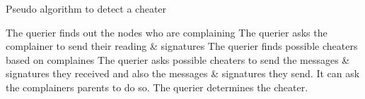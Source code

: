 \begin{algorithm}
\caption{Pseudo algorithm to detect a cheater}
	\begin{algorithmic}[1]
			\STATE The querier finds out the nodes who are complaining 
			\STATE The querier asks the complainer to send their reading \& signatures
			\STATE The querier finds possible cheaters based on complaines
			\STATE The querier asks possible cheaters to send the messages \& signatures they received and also the messages \& signatures they send. It can ask the complainers parents to do so.
			\STATE The querier determines the cheater. 
	\end{algorithmic}
\end{algorithm}
